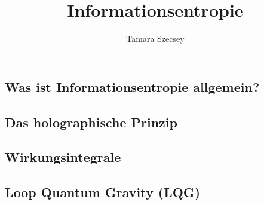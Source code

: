 \documentclass[screen, ngerman]{beamer}
\title{Informationsentropie}
\author{Tamara Szecsey}
\begin{document}
	\begin{frame}
		\maketitle
	\end{frame}
	
	
	\begin{frame}
		\tableofcontents
	\end{frame}
	
	\begin{frame}
		\section{Was ist Informationsentropie allgemein?}
	\end{frame}
	
	\begin{frame}	
		\section{Das holographische Prinzip}
	\end{frame}
	
	\begin{frame}
		\section{Wirkungsintegrale}
	\end{frame}	

	\begin{frame}
		\section{Loop Quantum Gravity (LQG)}
	\end{frame}
	
\end{document}
